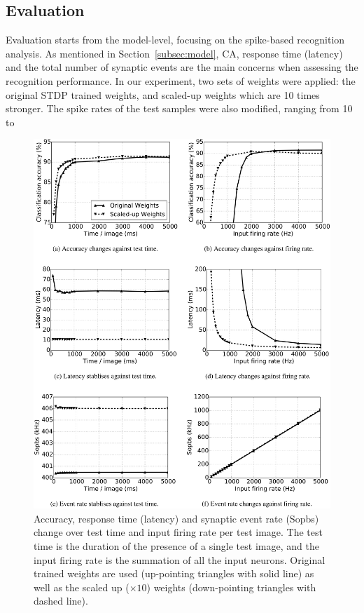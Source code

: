 \subsection{Evaluation}
Evaluation starts from the model-level, focusing on the spike-based recognition analysis.
As mentioned in Section~\ref{subsec:model}, CA, response time (latency) and the total number of synaptic events are the main concerns when assessing the recognition performance.
In our experiment, two sets of weights were applied: the original STDP trained weights, and \protect{} scaled-up weights which are 10 times stronger.
The spike rates of the test samples were also modified, ranging from 10 to \protect{} \protect{}
\begin{figure}[htb!]
	\centering
	\includegraphics[width=1\textwidth]{pics_bench/fig7.jpg}
	\caption{Accuracy, response time (latency) and synaptic event rate (Sopbs) change over test time and input firing rate per test image.
		The test time is the duration of the presence of a single test image, and the input firing rate is the summation of all the input neurons.
		Original trained weights are used (up-pointing triangles with solid line) as well as the scaled up ($\times10$) weights (down-pointing triangles with dashed line). }
	\label{fig:assess}
\end{figure}

